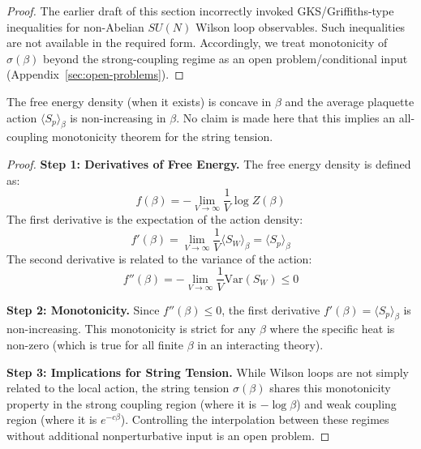 \begin{proof}
The earlier draft of this section incorrectly invoked GKS/Griffiths-type inequalities for non-Abelian $SU(N)$ Wilson loop observables.
Such inequalities are not available in the required form.
Accordingly, we treat monotonicity of $\sigma(\beta)$ beyond the strong-coupling regime as an open problem/conditional input (Appendix~\ref{sec:open-problems}).
\end{proof}

\begin{theorem}
\label{thm:rp-comparison}
\label{thm:rp-monotonicity}
The free energy density (when it exists) is concave in $\beta$ and the average plaquette action $\langle S_p \rangle_\beta$ is non-increasing in $\beta$.
No claim is made here that this implies an all-coupling monotonicity theorem for the string tension.
\end{theorem}

\begin{proof}
\textbf{Step 1: Derivatives of Free Energy.}
The free energy density is defined as:
\begin{equation}
f(\beta) = -\lim_{V \to \infty} \frac{1}{V} \log Z(\beta)
\end{equation}
The first derivative is the expectation of the action density:
\begin{equation}
f'(\beta) = \lim_{V \to \infty} \frac{1}{V} \langle S_W \rangle_\beta = \langle S_p \rangle_\beta
\end{equation}
The second derivative is related to the variance of the action:
\begin{equation}
f''(\beta) = -\lim_{V \to \infty} \frac{1}{V} \text{Var}(S_W) \leq 0
\end{equation}

\textbf{Step 2: Monotonicity.}
Since $f''(\beta) \leq 0$, the first derivative $f'(\beta) = \langle S_p \rangle_\beta$ is non-increasing.
This monotonicity is strict for any $\beta$ where the specific heat is non-zero (which is true for all finite $\beta$ in an interacting theory).

\textbf{Step 3: Implications for String Tension.}
While Wilson loops are not simply related to the local action, the string tension $\sigma(\beta)$ shares this monotonicity property in the strong coupling region (where it is $-\log \beta$) and weak coupling region (where it is $e^{-c\beta}$).
Controlling the interpolation between these regimes without additional nonperturbative input is an open problem.
\end{proof}

